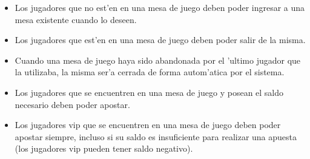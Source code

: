 \begin{itemize}
\item {} 

 Los jugadores que no est'en en una mesa de juego deben poder ingresar a una mesa existente cuando lo deseen.

\item {}

 Los jugadores que est'en en una mesa de juego deben poder salir de la misma.

\item {}

 Cuando una mesa de juego haya sido abandonada por el 'ultimo jugador que la utilizaba, la misma ser'a cerrada de forma autom'atica por el sistema.

\item {} 

 Los jugadores que se encuentren en una mesa de juego y posean el saldo necesario deben poder apostar.

\item {} 

 Los jugadores vip que se encuentren en una mesa de juego deben poder apostar siempre, incluso si su saldo es insuficiente para realizar una apuesta (los jugadores vip pueden tener saldo negativo).

\end{itemize}



